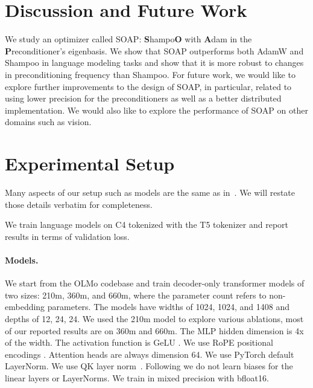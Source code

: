 \documentclass{article} %
\begin{document}
\section{Discussion and Future Work}
We study an optimizer called SOAP: \textbf{S}hampo\textbf{O} with \textbf{A}dam in the \textbf{P}reconditioner's eigenbasis. We show that SOAP outperforms both AdamW and Shampoo in language modeling tasks and show that it is more robust to changes in preconditioning frequency than Shampoo. For future work, we would like to explore further improvements to the design of SOAP, in particular, related to using lower precision for the preconditioners as well as a better distributed implementation. We would also like to explore the performance of SOAP on other domains such as vision.






\appendix


\section{Experimental Setup}
\label{app:setup}




Many aspects of our setup such as models are the same as in~\citet{zhaoscience}. We will restate those details verbatim for completeness.


We train language models on C4 tokenized with the T5 tokenizer \citep{raffel2020exploring} and report results in terms of validation loss.

\paragraph{Models.} We start from the OLMo codebase \citep{groeneveld2024olmo} and train decoder-only transformer models of two sizes: 210m, 360m, and 660m, where the parameter count refers to non-embedding parameters. The models have widths of 1024, 1024, and 1408 and depths of 12, 24, 24. We used the 210m model to explore various ablations, most of our reported results are on 360m and 660m. The MLP hidden dimension is 4x of the width. The activation function is GeLU \citep{hendrycks2016gaussian}. We use RoPE positional encodings \citep{su2024roformer}. Attention heads are always dimension 64. We use PyTorch default LayerNorm. We use QK layer norm~\citep{dehghani2023scaling}. Following \citet{wortsman2024smallscale} we do not learn biases for the linear layers or LayerNorms. We train in mixed precision with bfloat16.
\end{document}
